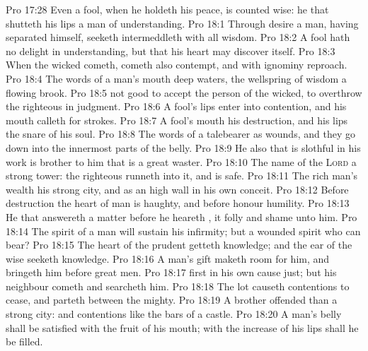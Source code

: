 \vs Pro 17:28 Even a fool, when he holdeth his peace, is counted wise:  he that shutteth his lips  a man of understanding.
\vs Pro 18:1 Through desire a man, having separated himself, seeketh  intermeddleth with all wisdom.
\vs Pro 18:2 A fool hath no delight in understanding, but that his heart may discover itself.
\vs Pro 18:3 When the wicked cometh,  cometh also contempt, and with ignominy reproach.
\vs Pro 18:4 The words of a man's mouth  deep waters,  the wellspring of wisdom  a flowing brook.
\vs Pro 18:5  not good to accept the person of the wicked, to overthrow the righteous in judgment.
\vs Pro 18:6 A fool's lips enter into contention, and his mouth calleth for strokes.
\vs Pro 18:7 A fool's mouth  his destruction, and his lips  the snare of his soul.
\vs Pro 18:8 The words of a talebearer  as wounds, and they go down into the innermost parts of the belly.
\vs Pro 18:9 He also that is slothful in his work is brother to him that is a great waster.
\vs Pro 18:10 The name of the \textsc{Lord}  a strong tower: the righteous runneth into it, and is safe.
\vs Pro 18:11 The rich man's wealth  his strong city, and as an high wall in his own conceit.
\vs Pro 18:12 Before destruction the heart of man is haughty, and before honour  humility.
\vs Pro 18:13 He that answereth a matter before he heareth , it  folly and shame unto him.
\vs Pro 18:14 The spirit of a man will sustain his infirmity; but a wounded spirit who can bear?
\vs Pro 18:15 The heart of the prudent getteth knowledge; and the ear of the wise seeketh knowledge.
\vs Pro 18:16 A man's gift maketh room for him, and bringeth him before great men.
\vs Pro 18:17  first in his own cause  just; but his neighbour cometh and searcheth him.
\vs Pro 18:18 The lot causeth contentions to cease, and parteth between the mighty.
\vs Pro 18:19 A brother offended  than a strong city: and  contentions  like the bars of a castle.
\vs Pro 18:20 A man's belly shall be satisfied with the fruit of his mouth;  with the increase of his lips shall he be filled.
